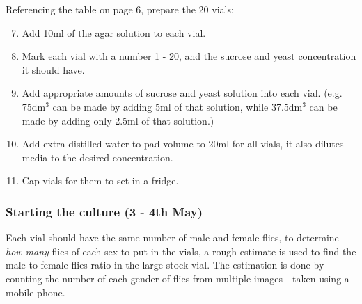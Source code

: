 \documentclass{article}
\begin{document}
\noindent
Referencing the table on page 6, prepare the 20 vials:

\begin{enumerate}
    \setcounter{enumi}{6}
    \item Add 10ml of the agar solution to each vial.
    \item Mark each vial with a number 1 - 20, and the sucrose and yeast concentration it should have.
    \item Add appropriate amounts of sucrose and yeast solution into each vial. (e.g. 75dm$^3$ can be made by adding 5ml of that solution, while 37.5dm$^3$ can be made by adding only 2.5ml of that solution.)
    \item Add extra distilled water to pad volume to 20ml for all vials, it also dilutes media to the desired concentration.
    \item Cap vials for them to set in a fridge.
\end{enumerate}

\begin{figure}[ht]
  \centering
  \hfill
\end{figure}

\subsubsection{Starting the culture (3 - 4th May)}

Each vial should have the same number of male and female flies, to determine \emph{how many} flies of each sex to put in the vials, a rough estimate is used to find the male-to-female flies ratio in the large stock vial. The estimation is done by counting the number of each gender of flies from multiple images - taken using a mobile phone.
\end{document}
